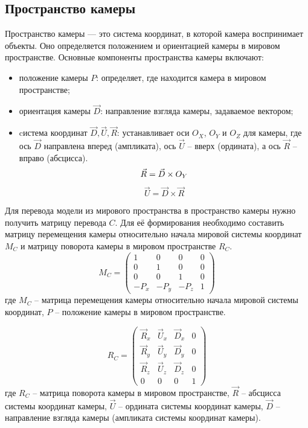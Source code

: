 \subsection{Пространство камеры}

Пространство камеры — это система координат, в которой камера воспринимает объекты. Оно определяется положением и ориентацией камеры в мировом пространстве. Основные компоненты пространства камеры включают:

\begin{itemize}[label=--]
	\item положение камеры $P$: определяет, где находится камера в мировом пространстве;
	\item ориентация камеры $\vec{D}$: направление взгляда камеры, задаваемое вектором;
	\item cистема координат $\vec{D}, \vec{U}, \vec{R}$: устанавливает оси $O_X$, $O_Y$ и $O_Z$ для камеры, где ось $\vec{D}$ направлена вперед (ампликата), ось $\vec{U}$ -- вверх (ордината), а ось $\vec{R}$ -- вправо (абсцисса).
	\begin{equation}
		\vec{R} = \vec{D} \times O_Y \\
	\end{equation}
	\begin{equation}
		\vec{U} = \vec{D} \times \vec{R}
	\end{equation}
\end{itemize}

Для перевода модели из мирового пространства в пространство камеры нужно получить матрицу перевода $C$. Для её формирования необходимо составить матрицу перемещения камеры относительно начала мировой системы координат $M_C$ и матрицу поворота камеры в мировом пространстве $R_C$.
\begin{equation}
	M_C = 
	\begin{pmatrix}
		1 & 0 & 0 & 0 \\
		0 & 1 & 0 & 0 \\
		0 & 0 & 1 & 0 \\
		-P_x & -P_y & -P_z & 1
	\end{pmatrix}
\end{equation}
где $M_C$ -- матрица перемещения камеры относительно начала мировой системы координат, $P$ -- положение камеры в мировом пространстве.

\begin{equation}
	R_C = 
	\begin{pmatrix}
		\vec{R}_x & \vec{U}_x & \vec{D}_x & 0 \\
		\vec{R}_y & \vec{U}_y & \vec{D}_y & 0 \\
		\vec{R}_z & \vec{U}_z & \vec{D}_z & 0 \\
		0 & 0 & 0 & 1 
	\end{pmatrix}
\end{equation}
где $R_C$ -- матрица поворота камеры в мировом пространстве, $\vec{R}$ -- абсцисса системы координат камеры, $\vec{U}$ -- ордината системы координат камеры, $\vec{D}$ -- направление взгляда камеры (ампликата системы координат камеры).

